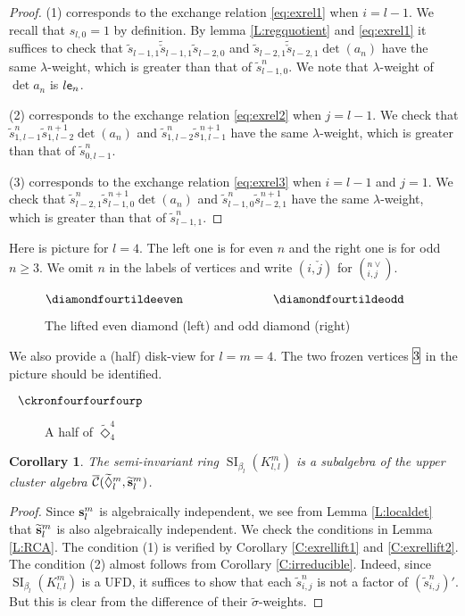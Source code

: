 \documentclass{amsart}
\newtheorem{corollary}[theorem]{Corollary}
\theoremstyle{definition}
\theoremstyle{remark}
\numberwithin{equation}{section}
\DeclareMathOperator{\SI}{SI}
\newcommand{\mc}[1]{\mathcal{#1}}
\renewcommand{\b}[1]{\bold{#1}}
\newcommand{\br}[1]{\overline{#1}}
\newcommand{\wtd}[1]{\widetilde{#1}}
\newcommand{\e}{{\sf e}}
\newcommand{\fr}[1]{\framebox[1.2\width]{{${#1}$}}}
\newcommand{\uca}{\br{\mc{C}}}
\newcommand{\kllm}{{K_{l,l}^m}}
\newcommand{\bl}{{\beta_l}}
\newcommand{\ijn}{_{i,j}^{n}}
\begin{document}
\begin{proof} (1) corresponds to the exchange relation \eqref{eq:exrel1} when $i=l-1$.
We recall that $s_{l,0}=1$ by definition. 
By lemma \ref{L:regquotient} and \eqref{eq:exrel1} it suffices to check that $\wtd{s}_{l-1,1}\wtd{\check{s}}_{l-1,1}\wtd{s}_{l-2,0}$ and $\wtd{s}_{l-2,1}\wtd{\check{s}}_{l-2,1}\det(a_{n})$ have the same $\lambda$-weight, which is greater than that of $\wtd{s}_{l-1,0}^n$. We note that $\lambda$-weight of $\det a_n$ is $l\e_n$.

(2) corresponds to the exchange relation \eqref{eq:exrel2} when $j=l-1$.
We check that $\wtd{s}_{1,l-1}^n \wtd{s}_{1,l-2}^{n+1}\det(a_{n})$ and $\wtd{s}_{1,l-2}^{n} \wtd{s}_{1,l-1}^{n+1}$ have the same $\lambda$-weight, which is greater than that of $\wtd{s}_{0,l-1}^n$.

(3) corresponds to the exchange relation \eqref{eq:exrel3} when $i=l-1$ and $j=1$.
We check that $\wtd{s}_{l-2,1}^{n} \wtd{s}_{l-1,0}^{n+1}\det(a_n)$ and $\wtd{s}_{l-1,0}^n \wtd{s}_{l-2,1}^{n+1}$ have the same $\lambda$-weight, which is greater than that of $\wtd{s}_{l-1,1}^n$.
\end{proof}
\noindent Here is picture for $l=4$. The left one is for even $n$ and the right one is for odd $n\geq 3$.
We omit $n$ in the labels of vertices and write $(i,\check{j})$ for $(_{i,j}^{n\vee})$.
\begin{figure}[!h] $\diamondfourtildeeven \hspace{1in} \diamondfourtildeodd$ \caption{The lifted even diamond (left) and odd diamond (right)} \label{f:diamondtilde} \end{figure}
\noindent We also provide a (half) disk-view for $l=m=4$. The two frozen vertices $\fr{3}$ in the picture should be identified.
\begin{figure}[!h] $\hspace{-.3in} \ckronfourfourfourp$ \caption{A half of $\wtd{\Diamond}_{4}^4$} \label{f:diamond444p} \end{figure}


\begin{corollary} \label{C:RCA} The semi-invariant ring $\SI_\bl(\kllm)$ is a subalgebra of the upper cluster algebra $\uca(\wtd{\Diamond}_l^m,\wtd{\b{s}}_l^m)$.
\end{corollary} 
\begin{proof} Since $\b{s}_l^m$ is algebraically independent, we see from Lemma \ref{L:localdet} that $\wtd{\b{s}}_l^m$ is also algebraically independent. We check the conditions in Lemma \ref{L:RCA}.
The condition (1) is verified by Corollary \ref{C:exrellift1} and \ref{C:exrellift2}.
The condition (2) almost follows from Corollary \ref{C:irreducible}.
Indeed, since $\SI_\bl(\kllm)$ is a UFD, it suffices to show that each $\wtd{s}\ijn$ is not a factor of $(\wtd{s}\ijn)'$.
But this is clear from the difference of their $\wtd{\sigma}$-weights.
\end{proof}
\end{document}
